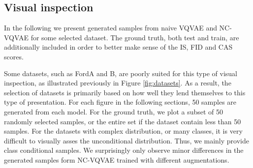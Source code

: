 \documentclass[../../thesis.tex]{subfiles}
\begin{document}










\subsection{Visual inspection}
\label{section:Visual inspection}
In the following we present generated samples from naive VQVAE and NC-VQVAE for some selected dataset. The ground truth, both test and train, are additionally included in order to better make sense of the IS, FID and CAS scores. \newline

Some datasets, such as FordA and B, are poorly suited for this type of visual inspection, as illustrated previously in Figure \ref{fig:datasets}. As a result, the selection of datasets is primarily based on how well they lend themselves to this type of presentation. For each figure in the following sections, 50 samples are generated from each model. For the ground truth, we plot a subset of 50 randomly selected samples, or the entire set if the dataset contain less than 50 samples. For the datasets with complex distribution, or many classes, it is very difficult to visually asses the unconditional distribution. Thus, we mainly provide class conditional samples. We surprisingly only observe minor differences in the generated samples form NC-VQVAE trained with different augmentations.\newline
\end{document}
